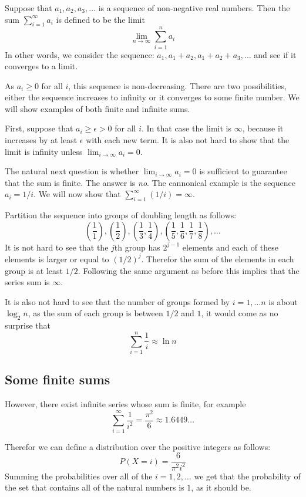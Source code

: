 \documentclass{report}
\theoremstyle{plain}
\theoremstyle{definition}
\begin{document}
Suppose that $a_1,a_2,a_3,\ldots$ is a sequence of non-negative real
numbers. Then the sum $\sum_{i=1}^\infty a_i$ is defined to be the
limit
\[
\lim_{n \to \infty} \sum_{i=1}^n a_i
\]
In other words, we consider the sequence:
$a_1,a_1+a_2,a_1+a_2+a_3,\ldots$ and see if it converges to a limit.

As $a_i \geq 0$ for all $i$, this sequence is non-decreasing. There
are two possibilities, either the sequence increases to infinity or it
converges to some finite number. We will show examples of both finite
and infinite sums.

First, suppose that $a_i \geq \epsilon>0$ for all $i$. In that case
the limit is $\infty$, because it increases by at least $\epsilon$
with each new term. It is also not hard to show that the limit is
infinity unless $\lim_{i \to \infty} a_i =0$.

The natural next question is whether $\lim_{i \to \infty} a_i =0$ is
sufficient to guarantee that the sum is finite. The answer is {\em
  no}. The cannonical example is the sequence $a_i=1/i$. We will now
show that $\sum_{i=1}^\infty (1/i) = \infty$.

Partition the sequence into groups of doubling length as follows:
\newcommand{\paren}[1]{\left( #1 \right)}
\[
\paren{\frac{1}{1}},
\paren{\frac{1}{2}},
\paren{\frac{1}{3},\frac{1}{4}},
\paren{\frac{1}{5},\frac{1}{6},\frac{1}{7},\frac{1}{8}},\ldots
\]
It is not hard to see that the $j$th group has $2^{j-1}$ elements and
each of these elements is larger or equal to $(1/2)^j$. Therefor the
sum of the elements in each group is at least $1/2$. Following the
same argument as before this implies that the series sum is $\infty$.

It is also not hard to see that the number of groups formed by
$i=1,\ldots n$ is about $\log_2 n$, as the sum of each group is
between $1/2$ and $1$, it would come as no surprise that 
\[
\sum_{i=1}^n \frac{1}{i} \approx \ln n
\]

\subsection{Some finite sums}
However, there exist infinite series whose sum is finite, for example
\[
\sum_{i=1}^{\infty} \frac{1}{i^2} = \frac{\pi^2}{6} \approx 1.6449\ldots
\]

Therefor we can define a distribution over the positive integers as
follows:
\[
P(X=i) = \frac{6}{\pi^2 i^2}
\]
Summing the probabilities over all of the $i=1,2,\ldots$ we get that
the probability of the set that contains all of the natural numbers is
$1$, as it should be.
\end{document}
